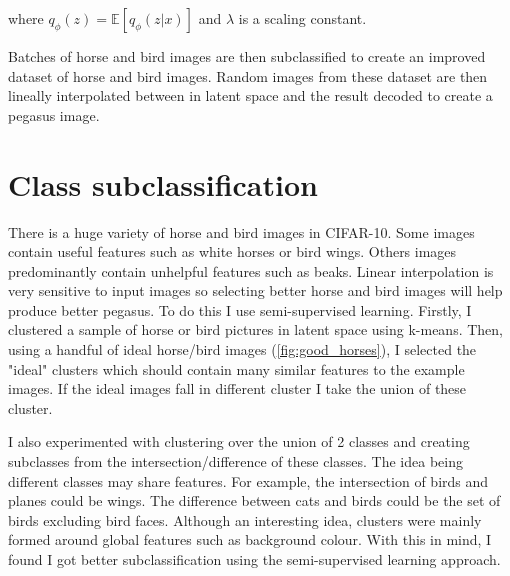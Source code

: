\documentclass{article}
\begin{document}
where $q_\phi(z) =  \mathbb{E}[q_\phi(z|x)]$ and $\lambda$ is a scaling constant.

Batches of horse and bird images are then subclassified to create an improved dataset of horse and bird images. Random images from these dataset are then lineally interpolated between in latent space and the result decoded to create a pegasus image. 

\section{Class subclassification}
There is a huge variety of horse and bird images in CIFAR-10. Some images contain useful features such as white horses or bird wings. Others images predominantly contain unhelpful features such as beaks. Linear interpolation is very sensitive to input images so selecting better horse and bird images will help produce better pegasus. To do this I use semi-supervised learning. Firstly, I clustered a sample of horse or bird pictures in latent space using k-means. Then, using a handful of ideal horse/bird images (\ref{fig:good_horses}), I selected the "ideal" clusters which should contain many similar features to the example images. If the ideal images fall in different cluster I take the union of these cluster.

I also experimented with clustering over the union of 2 classes and creating subclasses from the intersection/difference of these classes. The idea being different classes may share features. For example, the intersection of birds and planes could be wings. The difference between cats and birds could be the set of birds excluding bird faces. Although an interesting idea, clusters were mainly formed around global features such as background colour. With this in mind, I found I got better subclassification using the semi-supervised learning approach.
\end{document}
